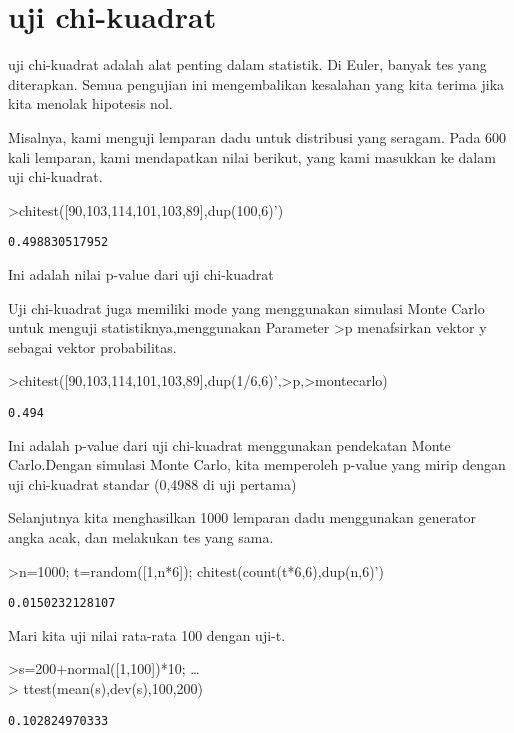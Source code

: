 \documentclass[
]{book}
\begin{document}
\chapter{uji chi-kuadrat}\label{uji-chi-kuadrat}

uji chi-kuadrat adalah alat penting dalam statistik. Di Euler, banyak tes yang diterapkan. Semua pengujian ini mengembalikan kesalahan yang kita terima jika kita menolak hipotesis nol.

Misalnya, kami menguji lemparan dadu untuk distribusi yang seragam. Pada 600 kali lemparan, kami mendapatkan nilai berikut, yang kami masukkan ke dalam uji chi-kuadrat.

\textgreater chitest({[}90,103,114,101,103,89{]},dup(100,6)')

\begin{verbatim}
0.498830517952
\end{verbatim}

Ini adalah nilai p-value dari uji chi-kuadrat

Uji chi-kuadrat juga memiliki mode yang menggunakan simulasi Monte Carlo untuk menguji statistiknya,menggunakan Parameter \textgreater p menafsirkan vektor y sebagai vektor probabilitas.

\textgreater chitest({[}90,103,114,101,103,89{]},dup(1/6,6)',\textgreater p,\textgreater montecarlo)

\begin{verbatim}
0.494
\end{verbatim}

Ini adalah p-value dari uji chi-kuadrat menggunakan pendekatan Monte Carlo.Dengan simulasi Monte Carlo, kita memperoleh p-value yang mirip dengan uji chi-kuadrat standar (0,4988 di uji pertama)

Selanjutnya kita menghasilkan 1000 lemparan dadu menggunakan generator angka acak, dan melakukan tes yang sama.

\textgreater n=1000; t=random({[}1,n*6{]}); chitest(count(t*6,6),dup(n,6)')

\begin{verbatim}
0.0150232128107
\end{verbatim}

Mari kita uji nilai rata-rata 100 dengan uji-t.

\textgreater s=200+normal({[}1,100{]})*10; \ldots{}\\
\textgreater{} ttest(mean(s),dev(s),100,200)

\begin{verbatim}
0.102824970333
\end{verbatim}
\end{document}

